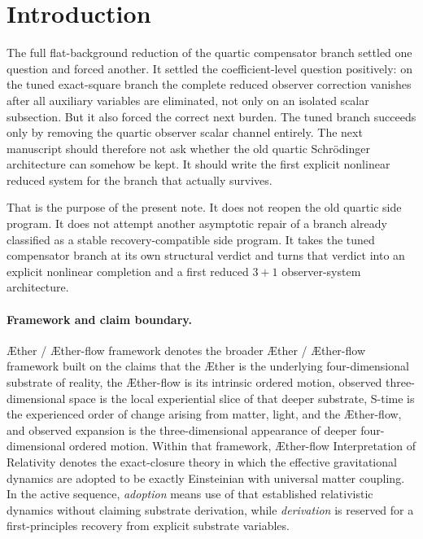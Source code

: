 \documentclass[11pt]{article}
\newcommand{\Aether}{\AE{}ther}
\newcommand{\Aflow}{\AE{}ther-flow}
\newcommand{\TheoryName}{\Aflow{} Interpretation of Relativity}
\newcommand{\TheoryProgram}{\Aether{} / \Aflow{} framework}
\begin{document}
\begin{abstract}
The narrowest honest theorem target is correspondingly smaller than the old fixed-completion asymptotic program. It is a first local well-posedness and continuation theorem in the same unit-lapse weighted/homogeneous class, followed by a corrected \(T\sim \varepsilon^{-1}\) coercive bootstrap for the mixed Einstein--trace/Stueckelberg-like momentum system. This note does not prove that theorem. It fixes the explicit tuned completion, the first reduced \(3+1\) architecture, the replacement scalar control variable, and the correct next theorem target.
\end{abstract}

\section{Introduction}

The full flat-background reduction of the quartic compensator branch settled one question and forced another. It settled the coefficient-level question positively: on the tuned exact-square branch the complete reduced observer correction vanishes after all auxiliary variables are eliminated, not only on an isolated scalar subsection. But it also forced the correct next burden. The tuned branch succeeds only by removing the quartic observer scalar channel entirely. The next manuscript should therefore not ask whether the old quartic Schr\"odinger architecture can somehow be kept. It should write the first explicit nonlinear reduced system for the branch that actually survives.

That is the purpose of the present note. It does not reopen the old quartic side program. It does not attempt another asymptotic repair of a branch already classified as a stable recovery-compatible side program. It takes the tuned compensator branch at its own structural verdict and turns that verdict into an explicit nonlinear completion and a first reduced \(3+1\) observer-system architecture.

\paragraph{Framework and claim boundary.}
\TheoryProgram{} denotes the broader \Aether{} / \Aflow{} framework built on the claims that the \Aether{} is the underlying four-dimensional substrate of reality, the \Aflow{} is its intrinsic ordered motion, observed three-dimensional space is the local experiential slice of that deeper substrate, S-time is the experienced order of change arising from matter, light, and the \Aflow{}, and observed expansion is the three-dimensional appearance of deeper four-dimensional ordered motion. Within that framework, \TheoryName{} denotes the exact-closure theory in which the effective gravitational dynamics are adopted to be exactly Einsteinian with universal matter coupling. In the active sequence, \emph{adoption} means use of that established relativistic dynamics without claiming substrate derivation, while \emph{derivation} is reserved for a first-principles recovery from explicit substrate variables.
\end{document}
